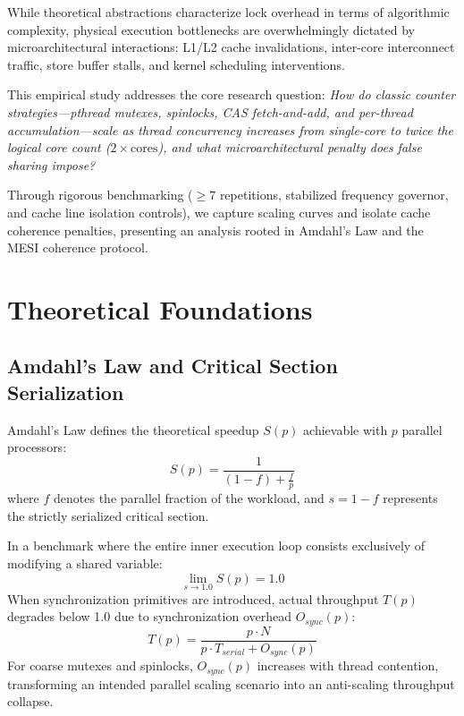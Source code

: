 \documentclass[conference]{IEEEtran}
\begin{document}
While theoretical abstractions characterize lock overhead in terms of algorithmic complexity, physical execution bottlenecks are overwhelmingly dictated by microarchitectural interactions: L1/L2 cache invalidations, inter-core interconnect traffic, store buffer stalls, and kernel scheduling interventions. 

This empirical study addresses the core research question: \textit{How do classic counter strategies---pthread mutexes, spinlocks, CAS fetch-and-add, and per-thread accumulation---scale as thread concurrency increases from single-core to twice the logical core count ($2\times\text{cores}$), and what microarchitectural penalty does false sharing impose?}

Through rigorous benchmarking ($\ge 7$ repetitions, stabilized frequency governor, and cache line isolation controls), we capture scaling curves and isolate cache coherence penalties, presenting an analysis rooted in Amdahl's Law and the MESI coherence protocol.

\section{Theoretical Foundations}

\subsection{Amdahl's Law and Critical Section Serialization}
Amdahl's Law defines the theoretical speedup $S(p)$ achievable with $p$ parallel processors:
\begin{equation}
S(p) = \frac{1}{(1 - f) + \frac{f}{p}}
\end{equation}
where $f$ denotes the parallel fraction of the workload, and $s = 1 - f$ represents the strictly serialized critical section.

In a benchmark where the entire inner execution loop consists exclusively of modifying a shared variable:
\begin{equation}
\lim_{s \to 1.0} S(p) = 1.0
\end{equation}
When synchronization primitives are introduced, actual throughput $T(p)$ degrades below 1.0 due to synchronization overhead $O_{sync}(p)$:
\begin{equation}
T(p) = \frac{p \cdot N}{p \cdot T_{serial} + O_{sync}(p)}
\end{equation}
For coarse mutexes and spinlocks, $O_{sync}(p)$ increases with thread contention, transforming an intended parallel scaling scenario into an anti-scaling throughput collapse.
\end{document}

